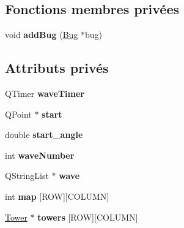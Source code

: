 \subsection*{Fonctions membres privées}
\begin{DoxyCompactItemize}
\item 
\hypertarget{classRender_a4a1fed13f76997e45e90dd39d622d33e}{
void {\bfseries addBug} (\hyperlink{classBug}{Bug} $\ast$bug)}
\label{classRender_a4a1fed13f76997e45e90dd39d622d33e}

\end{DoxyCompactItemize}
\subsection*{Attributs privés}
\begin{DoxyCompactItemize}
\item 
\hypertarget{classRender_a6351bb3de99ef093995785788c1d218e}{
QTimer {\bfseries waveTimer}}
\label{classRender_a6351bb3de99ef093995785788c1d218e}

\item 
\hypertarget{classRender_afa2c3b6d106bf91639ddf351d7d3315e}{
QPoint $\ast$ {\bfseries start}}
\label{classRender_afa2c3b6d106bf91639ddf351d7d3315e}

\item 
\hypertarget{classRender_ab66f1b35519a6e9d6fe14e75a6973680}{
double {\bfseries start\_\-angle}}
\label{classRender_ab66f1b35519a6e9d6fe14e75a6973680}

\item 
\hypertarget{classRender_a682e96907f3d52f710df4e9c2a5e9d07}{
int {\bfseries waveNumber}}
\label{classRender_a682e96907f3d52f710df4e9c2a5e9d07}

\item 
\hypertarget{classRender_a6b5e2349a706152d4763d22b995e9237}{
QStringList $\ast$ {\bfseries wave}}
\label{classRender_a6b5e2349a706152d4763d22b995e9237}

\item 
\hypertarget{classRender_a9c7793879c5007b8cae3a9c2885d283f}{
int {\bfseries map} \mbox{[}ROW\mbox{]}\mbox{[}COLUMN\mbox{]}}
\label{classRender_a9c7793879c5007b8cae3a9c2885d283f}

\item 
\hypertarget{classRender_a7b01b65692570fe6dec24d0a5c1aa178}{
\hyperlink{classTower}{Tower} $\ast$ {\bfseries towers} \mbox{[}ROW\mbox{]}\mbox{[}COLUMN\mbox{]}}
\label{classRender_a7b01b65692570fe6dec24d0a5c1aa178}


\end{DoxyCompactItemize}
